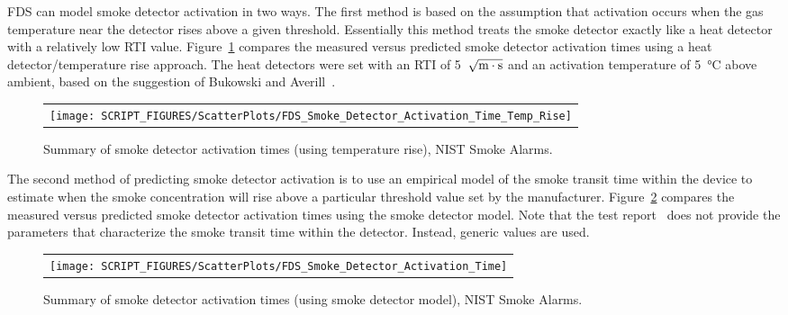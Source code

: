 FDS can model smoke detector activation in two ways. The first method is based on the assumption that activation occurs when the gas temperature near the detector rises above a given threshold. Essentially this method treats the smoke detector exactly like a heat detector with a relatively low RTI value. Figure~\ref{NIST_Smoke_Alarms_Scatterplot_Temp_Rise} compares the measured versus predicted smoke detector activation times using a heat detector/temperature rise approach. The heat detectors were set with an RTI of 5~$\sqrt{\hbox{m}\cdot \hbox{s}}$ and an activation temperature of \SI{5}{\celsius} above ambient, based on the suggestion of Bukowski and Averill~\cite{Bukowski:2}.

\begin{figure}[!h]
\begin{center}
\begin{tabular}{c}
\texttt{[image: SCRIPT\_FIGURES/ScatterPlots/FDS\_Smoke\_Detector\_Activation\_Time\_Temp\_Rise]}
\end{tabular}
\end{center}
\caption[Summary of smoke detector activation times (temperature rise), NIST Smoke Alarms.]
{Summary of smoke detector activation times (using temperature rise), NIST Smoke Alarms.}
\label{NIST_Smoke_Alarms_Scatterplot_Temp_Rise}
\end{figure}

The second method of predicting smoke detector activation is to use an empirical model of the smoke transit time within the device to estimate when the smoke concentration will rise above a particular threshold value set by the manufacturer. Figure~\ref{NIST_Smoke_Alarms_Scatterplot} compares the measured versus predicted smoke detector activation times using the smoke detector model. Note that the test report~\cite{Bukowski:1} does not provide the parameters that characterize the smoke transit time within the detector. Instead, generic values are used.


\begin{figure}[!h]
\begin{center}
\begin{tabular}{c}
\texttt{[image: SCRIPT\_FIGURES/ScatterPlots/FDS\_Smoke\_Detector\_Activation\_Time]}
\end{tabular}
\end{center}
\caption[Summary of activation times, smoke detector model, NIST Smoke Alarms.]
{Summary of smoke detector activation times (using smoke detector model), NIST Smoke Alarms.}
\label{NIST_Smoke_Alarms_Scatterplot}
\end{figure}








